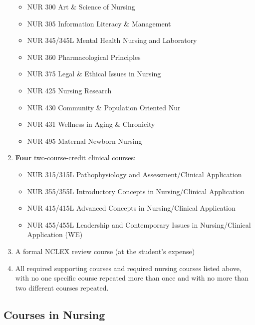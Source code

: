 \documentclass[
  letterpaper,
]{scrbook}
\providecommand{\tightlist}{%
  \setlength{\itemsep}{0pt}\setlength{\parskip}{0pt}}
\begin{document}
\begin{enumerate}
  \begin{itemize}
  \tightlist
  \item
    NUR 300 Art \& Science of Nursing
  \item
    NUR 305 Information Literacy \& Management
  \item
    NUR 345/345L Mental Health Nursing and Laboratory
  \item
    NUR 360 Pharmacological Principles
  \item
    NUR 375 Legal \& Ethical Issues in Nursing
  \item
    NUR 425 Nursing Research
  \item
    NUR 430 Community \& Population Oriented Nur
  \item
    NUR 431 Wellness in Aging \& Chronicity
  \item
    NUR 495 Maternal Newborn Nursing
  \end{itemize}
\item
  \textbf{Four} two-course-credit clinical courses:

  \begin{itemize}
  \tightlist
  \item
    NUR 315/315L Pathophysiology and Assessment/Clinical Application
  \item
    NUR 355/355L Introductory Concepts in Nursing/Clinical Application
  \item
    NUR 415/415L Advanced Concepts in Nursing/Clinical Application
  \item
    NUR 455/455L Leadership and Contemporary Issues in Nursing/Clinical
    Application (WE)
  \end{itemize}
\item
  A formal NCLEX review course (at the student's expense)
\item
  All required supporting courses and required nursing courses listed
  above, with no one specific course repeated more than once and with no
  more than two different courses repeated.
\end{enumerate}

\subsection{Courses in Nursing}\label{courses-in-nursing}
\end{document}
